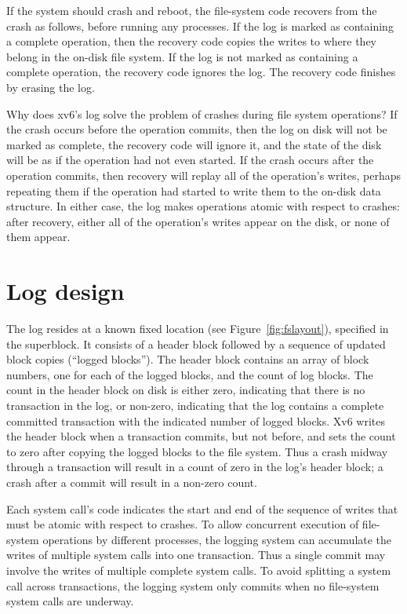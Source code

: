 If the system should crash and reboot, the file-system code recovers
from the crash as follows, before running any processes. If the log is
marked as containing a complete operation, then the recovery code
copies the writes to where they belong in the on-disk file system. If
the log is not marked as containing a complete operation, the recovery
code ignores the log.  The recovery code finishes by erasing
the log.

Why does xv6's log solve the problem of crashes during file system
operations? If the crash occurs before the operation commits, then the
log on disk will not be marked as complete, the recovery code will
ignore it, and the state of the disk will be as if the operation had
not even started. If the crash occurs after the operation commits,
then recovery will replay all of the operation's writes, perhaps
repeating them if the operation had started to write them to the
on-disk data structure. In either case, the log makes operations
atomic with respect to crashes: after recovery, either all of the
operation's writes appear on the disk, or none of them appear.


\section{Log design}

The log resides at a known fixed location (see
Figure~\ref{fig:fslayout}), specified in the superblock.
It consists of a header block followed by a sequence
of updated block copies (``logged blocks'').
The header block contains an array of block
numbers, one for each of the logged blocks, and 
the count of log blocks.
The count in the header block on disk is either
zero, indicating that there is no transaction in the log,
or non-zero, indicating that the log contains a complete committed
transaction with the indicated number of logged blocks.
Xv6 writes the header
block when a transaction commits, but not before, and sets the
count to zero after copying the logged blocks to the file system.
Thus a crash midway through a transaction will result in a
count of zero in the log's header block; a crash after a commit
will result in a non-zero count.

Each system call's code indicates the start and end of the sequence of
writes that must be atomic with respect to crashes.
To allow concurrent execution of file-system operations
by different processes,
the logging system can accumulate the writes
of multiple system calls into one transaction.
Thus a single commit may involve the writes of multiple
complete system calls.
To avoid splitting a system call across transactions, the logging system
only commits when no file-system system calls are underway.

